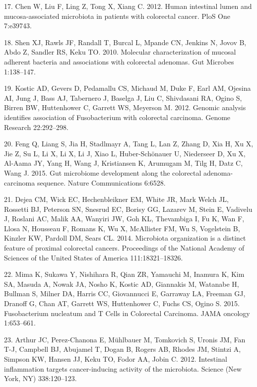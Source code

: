\documentclass[12pt,]{article}
\begin{document}
\hypertarget{ref-chen_human_2012}{}
17. Chen W, Liu F, Ling Z, Tong X, Xiang C. 2012. Human intestinal lumen
and mucosa-associated microbiota in patients with colorectal cancer.
PloS One 7:e39743.

\hypertarget{ref-shen_molecular_2010}{}
18. Shen XJ, Rawls JF, Randall T, Burcal L, Mpande CN, Jenkins N, Jovov
B, Abdo Z, Sandler RS, Keku TO. 2010. Molecular characterization of
mucosal adherent bacteria and associations with colorectal adenomas. Gut
Microbes 1:138--147.

\hypertarget{ref-kostic_genomic_2012}{}
19. Kostic AD, Gevers D, Pedamallu CS, Michaud M, Duke F, Earl AM,
Ojesina AI, Jung J, Bass AJ, Tabernero J, Baselga J, Liu C, Shivdasani
RA, Ogino S, Birren BW, Huttenhower C, Garrett WS, Meyerson M. 2012.
Genomic analysis identifies association of Fusobacterium with colorectal
carcinoma. Genome Research 22:292--298.

\hypertarget{ref-feng_gut_2015}{}
20. Feng Q, Liang S, Jia H, Stadlmayr A, Tang L, Lan Z, Zhang D, Xia H,
Xu X, Jie Z, Su L, Li X, Li X, Li J, Xiao L, Huber-Schönauer U,
Niederseer D, Xu X, Al-Aama JY, Yang H, Wang J, Kristiansen K, Arumugam
M, Tilg H, Datz C, Wang J. 2015. Gut microbiome development along the
colorectal adenoma-carcinoma sequence. Nature Communications 6:6528.

\hypertarget{ref-dejea_microbiota_2014}{}
21. Dejea CM, Wick EC, Hechenbleikner EM, White JR, Mark Welch JL,
Rossetti BJ, Peterson SN, Snesrud EC, Borisy GG, Lazarev M, Stein E,
Vadivelu J, Roslani AC, Malik AA, Wanyiri JW, Goh KL, Thevambiga I, Fu
K, Wan F, Llosa N, Housseau F, Romans K, Wu X, McAllister FM, Wu S,
Vogelstein B, Kinzler KW, Pardoll DM, Sears CL. 2014. Microbiota
organization is a distinct feature of proximal colorectal cancers.
Proceedings of the National Academy of Sciences of the United States of
America 111:18321--18326.

\hypertarget{ref-mima_fusobacterium_2015}{}
22. Mima K, Sukawa Y, Nishihara R, Qian ZR, Yamauchi M, Inamura K, Kim
SA, Masuda A, Nowak JA, Nosho K, Kostic AD, Giannakis M, Watanabe H,
Bullman S, Milner DA, Harris CC, Giovannucci E, Garraway LA, Freeman GJ,
Dranoff G, Chan AT, Garrett WS, Huttenhower C, Fuchs CS, Ogino S. 2015.
Fusobacterium nucleatum and T Cells in Colorectal Carcinoma. JAMA
oncology 1:653--661.

\hypertarget{ref-arthur_intestinal_2012}{}
23. Arthur JC, Perez-Chanona E, Mühlbauer M, Tomkovich S, Uronis JM, Fan
T-J, Campbell BJ, Abujamel T, Dogan B, Rogers AB, Rhodes JM, Stintzi A,
Simpson KW, Hansen JJ, Keku TO, Fodor AA, Jobin C. 2012. Intestinal
inflammation targets cancer-inducing activity of the microbiota. Science
(New York, NY) 338:120--123.
\end{document}
